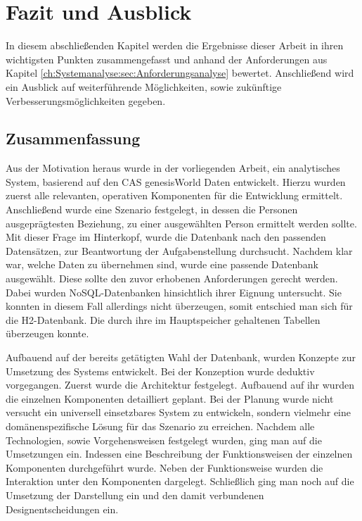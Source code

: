 
\chapter{Fazit und Ausblick}
\label{ch:Ergebnis}

In diesem abschließenden Kapitel werden die Ergebnisse dieser Arbeit in ihren wichtigsten Punkten zusammengefasst und anhand der Anforderungen aus Kapitel \ref{ch:Systemanalyse:sec:Anforderungsanalyse} bewertet. Anschließend wird ein Ausblick auf weiterführende Möglichkeiten, sowie zukünftige Verbesserungsmöglichkeiten gegeben. 

\section{Zusammenfassung}
\label{ch:Ergebnis:sec:zusammenfassung}

Aus der Motivation heraus wurde in der vorliegenden Arbeit, ein analytisches System, basierend auf den CAS genesisWorld Daten entwickelt. Hierzu wurden zuerst alle relevanten, operativen Komponenten für die Entwicklung ermittelt. Anschließend wurde eine Szenario festgelegt, in dessen die Personen ausgeprägtesten Beziehung, zu einer ausgewählten Person ermittelt werden sollte. Mit dieser Frage im Hinterkopf, wurde die Datenbank nach den passenden Datensätzen, zur Beantwortung der Aufgabenstellung durchsucht. Nachdem klar war, welche Daten zu übernehmen sind, wurde eine passende Datenbank ausgewählt. Diese sollte den zuvor erhobenen Anforderungen gerecht werden. Dabei wurden NoSQL-Datenbanken hinsichtlich ihrer Eignung untersucht. Sie konnten in diesem Fall allerdings nicht überzeugen, somit entschied man sich für die H2-Datenbank. Die durch ihre im Hauptspeicher gehaltenen Tabellen überzeugen konnte.   

Aufbauend auf der bereits getätigten Wahl der Datenbank, wurden Konzepte zur Umsetzung des Systems entwickelt. Bei der Konzeption wurde deduktiv vorgegangen. Zuerst wurde die Architektur festgelegt. Aufbauend auf ihr wurden die einzelnen Komponenten detailliert geplant. Bei der Planung wurde nicht versucht ein universell einsetzbares System zu entwickeln, sondern vielmehr eine domänenspezifische Lösung für das Szenario zu erreichen. Nachdem alle Technologien, sowie Vorgehensweisen festgelegt wurden, ging man auf die Umsetzungen ein. Indessen eine Beschreibung der Funktionsweisen der einzelnen Komponenten durchgeführt wurde. Neben der Funktionsweise wurden die Interaktion unter den Komponenten dargelegt. Schließlich ging man noch auf die Umsetzung der Darstellung ein und den damit verbundenen Designentscheidungen ein. 
 

